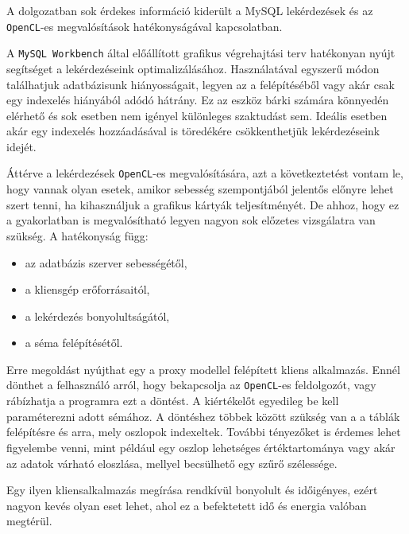 
A dolgozatban sok érdekes információ kiderült a MySQL lekérdezések és az \texttt{OpenCL}-es megvalósítások hatékonyságával kapcsolatban.

A \texttt{MySQL Workbench} által előállított grafikus végrehajtási terv hatékonyan nyújt segítséget a lekérdezéseink optimalizálásához. Használatával egyszerű módon találhatjuk adatbázisunk hiányosságait, legyen az a felépítéséből vagy akár csak egy indexelés hiányából adódó hátrány. Ez az eszköz bárki számára könnyedén elérhető és sok esetben nem igényel különleges szaktudást sem. Ideális esetben akár egy indexelés hozzáadásával is töredékére csökkenthetjük lekérdezéseink idejét.

Áttérve a lekérdezések \texttt{OpenCL}-es megvalósítására, azt a következtetést vontam le, hogy vannak olyan esetek, amikor sebesség szempontjából jelentős előnyre lehet szert tenni, ha kihasználjuk a grafikus kártyák teljesítményét. De ahhoz, hogy ez a gyakorlatban is megvalósítható legyen nagyon sok előzetes vizsgálatra van szükség. A hatékonyság függ:
\begin{itemize}
\item az adatbázis szerver sebességétől,
\item a kliensgép erőforrásaitól,
\item a lekérdezés bonyolultságától,
\item a séma felépítésétől.
\end{itemize}

Erre megoldást nyújthat egy a proxy modellel felépített kliens alkalmazás. Ennél dönthet a felhasználó arról, hogy bekapcsolja az \texttt{OpenCL}-es feldolgozót, vagy rábízhatja a programra ezt a döntést. A kiértékelőt egyedileg be kell paraméterezni adott sémához. A döntéshez többek között szükség van a a táblák felépítésre és arra, mely oszlopok indexeltek. További tényezőket is érdemes lehet figyelembe venni, mint például egy oszlop lehetséges értéktartománya vagy akár az adatok várható eloszlása, mellyel becsülhető egy szűrő szélessége. 

Egy ilyen kliensalkalmazás megírása rendkívül bonyolult és időigényes, ezért nagyon kevés olyan eset lehet, ahol ez a befektetett idő és energia valóban megtérül. 
